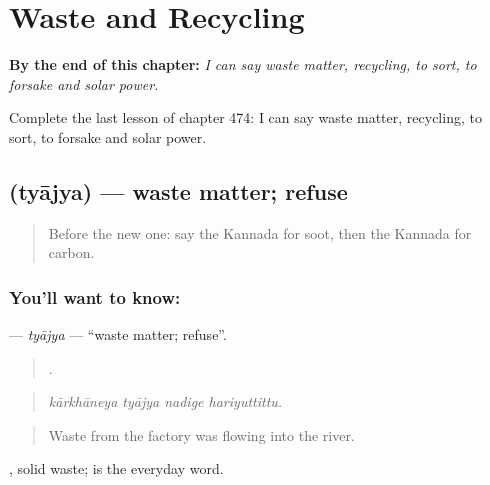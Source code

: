 
\chapter{Waste and Recycling}
\label{ch:ka-waste-and-recycling}

\begin{chapteropening}
\textbf{By the end of this chapter:} \emph{I can say waste matter, recycling, to sort, to forsake and solar power.}

Complete the last lesson of chapter 474: I can say waste matter, recycling, to sort, to forsake and solar power.
\end{chapteropening}

\section[\texorpdfstring{\kn{ತ್ಯಾಜ್ಯ} (tyājya)}{ತ್ಯಾಜ್ಯ (tyājya)}]{ (tyājya) — waste matter; refuse}

\label{lesson:KA-C474-tyajya}



\begin{quote}
Before the new one: say the Kannada for soot, then the Kannada for carbon.
\end{quote}

\subsection*{You'll want to know: }
\textbf{} — \emph{tyājya} — \textquotedblleft{}waste matter; refuse\textquotedblright{}.

\begin{quote}
   .
\end{quote}

\begin{quote}
\emph{kārkhāneya tyājya nadige hariyuttittu.}
\end{quote}

\begin{quote}
Waste from the factory was flowing into the river.
\end{quote}

 , solid waste;  is the everyday word.

